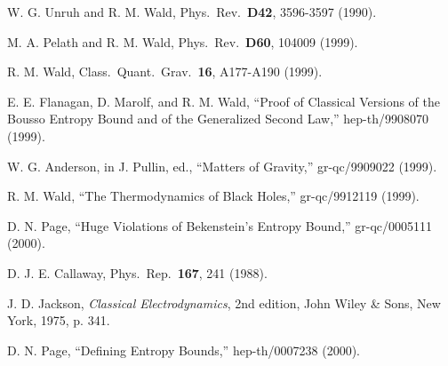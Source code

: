 \documentclass[a4paper,12pt]{article}
\begin{document}
\begin{thebibliography}{99}
W. G. Unruh and R. M. Wald,
Phys.\ Rev.\ {\bf D42}, 3596-3597 (1990).

M. A. Pelath and R. M. Wald,
Phys.\ Rev.\ {\bf D60}, 104009 (1999).

R. M. Wald,
Class.\ Quant.\ Grav.\ {\bf 16}, A177-A190 (1999).

E. E. Flanagan, D. Marolf, and R. M. Wald,
``Proof of Classical Versions of the Bousso Entropy Bound
and of the Generalized Second Law,''
hep-th/9908070 (1999).

W. G. Anderson, in J. Pullin, ed.,
``Matters of Gravity,'' gr-qc/9909022 (1999).

R. M. Wald,
``The Thermodynamics of Black Holes,'' gr-qc/9912119 (1999).

D. N. Page,
``Huge Violations of Bekenstein's Entropy Bound,''
gr-qc/0005111 (2000).

D. J. E. Callaway,
Phys.\ Rep.\ {\bf 167}, 241 (1988).

J. D. Jackson,
{\em Classical Electrodynamics}, 2nd edition,
John Wiley \& Sons, New York, 1975, p. 341.

D. N. Page,
``Defining Entropy Bounds,''
hep-th/0007238 (2000).

\end{thebibliography}
\end{document}
